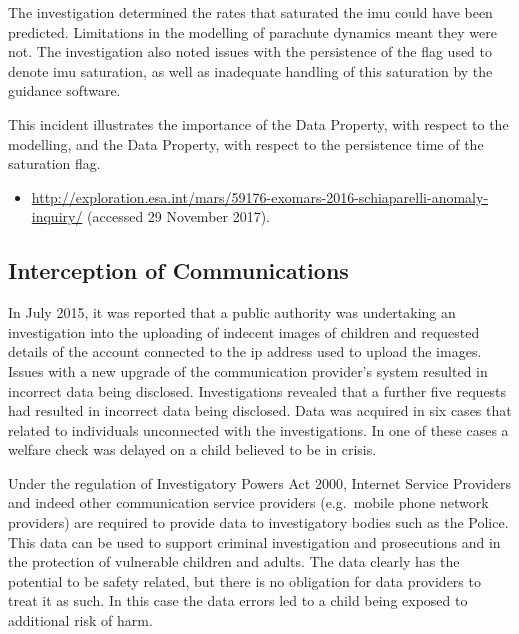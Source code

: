 The investigation determined the rates that saturated the \gls{imu} could have been predicted. Limitations in the modelling of parachute dynamics meant they were not. The investigation also noted issues with the persistence of the flag used to denote \gls{imu} saturation, as well as inadequate handling of this saturation by the guidance software.

This incident illustrates the importance of the  Data Property, with respect to the modelling, and the  Data Property, with respect to the persistence time of the saturation flag.

\begin{samepage}
\begin{itemize}
	\item \raggedright{\href{http://exploration.esa.int/mars/59176-exomars-2016-schiaparelli-anomaly-inquiry/}{http://exploration.esa.int/mars/59176-exomars-2016-schiaparelli-anomaly-inquiry/} (accessed 29 November 2017).}
\end{itemize}
\end{samepage}


\subsection{Interception of Communications} \label{bkm:incacc:comintercept}
In July 2015, it was reported that a public authority was undertaking an investigation into the uploading of indecent images of children and requested details of the account connected to the \gls{ip} address used to upload the images. Issues with a new upgrade of the communication provider's system resulted in incorrect data being disclosed. Investigations revealed that a further five requests had resulted in incorrect data being disclosed. Data was acquired in six cases that related to individuals unconnected with the investigations. In one of these cases a welfare check was delayed on a child believed to be in crisis.

Under the regulation of Investigatory Powers Act 2000, Internet Service Providers and indeed other communication service providers (e.g.\ mobile phone network providers) are required to provide data to investigatory bodies such as the Police. This data can be used to support criminal investigation and prosecutions and in the protection of vulnerable children and adults. The data clearly has the potential to be safety related, but there is no obligation for data providers to treat it as such. In this case the \glspl{data error} led to a child being exposed to additional risk of harm.

